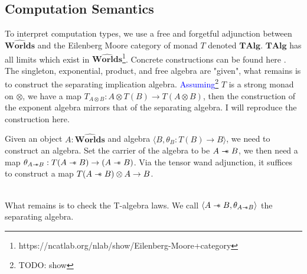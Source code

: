 \documentclass{article}
\newcommand{\blue}[1]{\textcolor{blue}{#1}}
\newcommand{\sep}{\mathrel{-\mkern-6mu*}}
\newcommand{\worlds}{\widehat{\mathbf{Worlds}}}
\begin{document}
\subsection{Computation Semantics}
To interpret computation types, we use a free and forgetful adjunction between $\worlds$ and the Eilenberg Moore category of monad $T$ denoted $\mathbf{TAlg}$. $\mathbf{TAlg}$ has all limits which exist in $\worlds$\footnote{https://ncatlab.org/nlab/show/Eilenberg-Moore+category}. Concrete constructions can be found here \cite{forster_call-by-push-value_2019}. The singleton, exponential, product, and free algebra are "given", what remains is to construct the separating implication algebra. 
\blue{Assuming}\footnote{TODO: show} $T$ is a strong monad on $\otimes$, we have a map $T_{A \otimes B} : A \otimes T(B) \rightarrow T(A \otimes B)$, then the construction of the exponent algebra mirrors that of the separating algebra. I will reproduce the construction here.

Given an object $A : \worlds$ and algebra $\langle B , \theta_B : T(B) \rightarrow B\rangle$, we need to construct an algebra. Set the carrier of the algebra to be $A \sep B$, we then need a map $\theta_{A\sep B} : T(A \sep B) \rightarrow (A \sep B)$. Via the tensor wand adjunction, it suffices to construct a map $T(A \sep B)\otimes A \rightarrow B$.
\begin{figure}[!ht]
\centering
{}
\end{figure}
\\
What remains is to check the T-algebra laws. We call $\langle A \sep B , \theta_{A \sep B}\rangle$ the separating algebra.

\newpage
\end{document}
